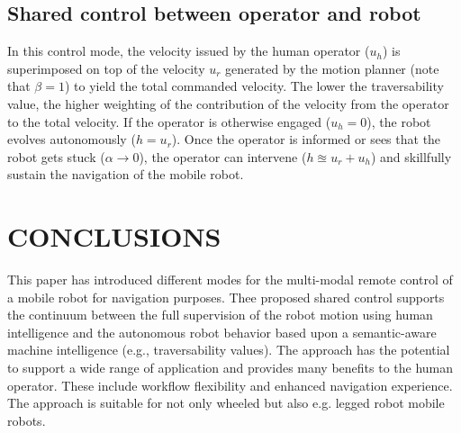 \documentclass[letterpaper, 10 pt, conference]{ieeeconf}  %
\begin{document}
\subsection{Shared control between operator and robot}
In this control mode, the velocity issued by the human operator ($u_h$) is superimposed on top of the velocity $u_r$ generated by the motion planner (note that $\beta = 1$) to yield the  total commanded velocity.  The lower the traversability value, the higher weighting of the contribution  of the velocity from the operator to the total velocity. If the operator is otherwise engaged ($u_h=0$), the robot evolves autonomously ($h=u_r$). Once the operator is informed or sees that the robot gets stuck ($\alpha \rightarrow 0$), the operator can intervene ($h\approxeq u_r + u_h$) and skillfully sustain the navigation of the mobile robot. 
\section{CONCLUSIONS}
This paper has introduced different modes for the multi-modal remote control of a mobile robot for navigation purposes. Thee proposed shared control supports the continuum between the full supervision of the robot motion using human intelligence  and the autonomous robot behavior based upon a semantic-aware machine intelligence (e.g., traversability values). The approach has the potential to support a wide range of application and provides many benefits to the human operator. These include workflow flexibility and enhanced navigation experience. The approach is suitable for not only wheeled but also e.g. legged robot mobile robots.

\addtolength{\textheight}{-12cm}   %




\end{document}
